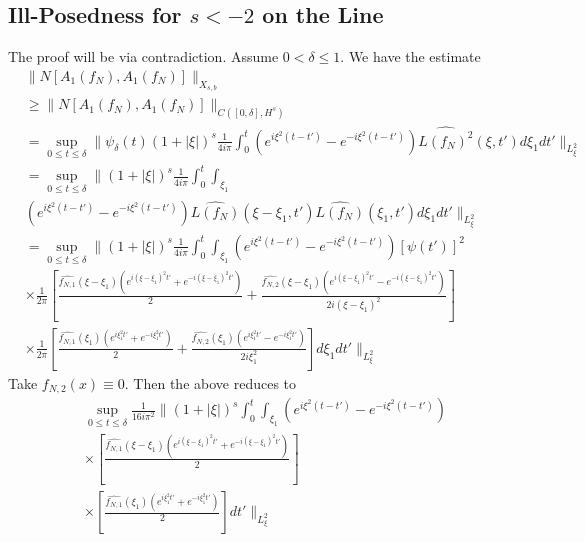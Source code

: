 \documentclass[12pt,reqno]{amsart}
\numberwithin{equation}{section}  %
\newcommand{\wh}{\widehat}
\begin{document}
\subsection{Ill-Posedness for $s < -2$ on the Line} 
\label{realsec:ill-pos-line}
The proof will be via contradiction. Assume $0 < \delta \le 1$. We have the estimate
%
%
\begin{equation*}
\begin{split}
  & \| N[A_{1}(f_{N}), A_{1}(f_{N})] \|_{X_{s,b}}
  \\
 & \ge
  \| N[A_{1}(f_{N}), A_{1}(f_{N})] \|_{C([0, \delta],
  H^{s})} 
  \\
  & = \sup_{0 \le t \le \delta} \| \psi_{\delta}(t) (1 + | \xi |)^{s}
  \frac{1}{4 i \pi} \int_{0}^{t} \left( e^{i\xi^{2}(t-t')} - e^{-i\xi^{2}(t-t')} \right)
  \wh{L(f_{N})^{2}}(\xi, t') d \xi_{1} dt' \|_{L^{2}_{\xi}}
  \\
  & = \sup_{0 \le t \le \delta} \| (1 + | \xi |)^{s} \frac{1}{4 i \pi} 
  \int_{0}^{t} \int_{\xi_{1}}
  \\
  & \left( e^{i\xi^{2}(t-t')} - e^{-i\xi^{2}(t-t')} \right)
  \wh{L(f_{N})}(\xi - \xi_{1}, t')\wh{L(f_{N})}(\xi_{1}, t') d
  \xi_{1} dt'
  \|_{L^{2}_{\xi}}
  \\
  & = \sup_{0 \le t \le \delta} \| (1 + | \xi |)^{s} \frac{1}{4 i \pi} 
  \int_{0}^{t} \int_{\xi_{1}} \left( e^{i\xi^{2}(t-t')} - e^{-i\xi^{2}(t-t')} \right)
  [\psi(t')]^{2}
  \\
  & \times \frac{1}{2 \pi} \left[ \frac{\wh{f_{N,1}}(\xi - \xi_{1})\left( e^{i(\xi - \xi_{1})^{2}t'} +
  e^{-i(\xi - \xi_{1})^{2}t'} \right)}{2} + \frac{\wh{f_{N,2}}(\xi - \xi_{1})\left(
  e^{i(\xi - \xi_{1})^{2}t'} - e^{-i(\xi - \xi_{1})^{2}t'}
  \right)}{2i(\xi - \xi_{1})^{2}} \right]
  \\
  & \times \frac{1}{2 \pi} \left[ \frac{\wh{f_{N,1}}(\xi_{1})\left( e^{i\xi_{1}^{2}t'} +
  e^{-i\xi_{1}^{2}t'} \right)}{2} + \frac{\wh{f_{N,2}}(\xi_{1})\left(
  e^{i\xi_{1}^{2}t'} - e^{-i\xi_{1}^{2}t'}
  \right)}{2 i \xi_{1}^{2}} \right] d \xi_{1} dt' \|_{L^{2}_{\xi}}
\end{split}
\end{equation*}
%
Take $f_{N,2}(x) \equiv 0$. Then the above reduces to
%
%
\begin{equation*}
\begin{split}
  & \sup_{0 \le t \le \delta} \frac{1}{16 i \pi^{2}}\| (1 + | \xi |)^{s}
  \int_{0}^{t} \int_{\xi_{1}} \left( e^{i\xi^{2}(t-t')} - e^{-i\xi^{2}(t-t')} \right)
  \\
  & \times \left[ \frac{\wh{f_{N,1}}(\xi - \xi_{1})\left( e^{i(\xi - \xi_{1})^{2}t'} +
  e^{-i(\xi - \xi_{1})^{2}t'} \right)}{2} \right ]
  \\
  & \times \left[ \frac{\wh{f_{N,1}}(\xi_{1})\left( e^{i\xi_{1}^{2}t'} +
  e^{-i\xi_{1}^{2}t'} \right)}{2}  \right]
  dt' \|_{L^{2}_{\xi}}
\end{split}
\end{equation*}
\end{document}
